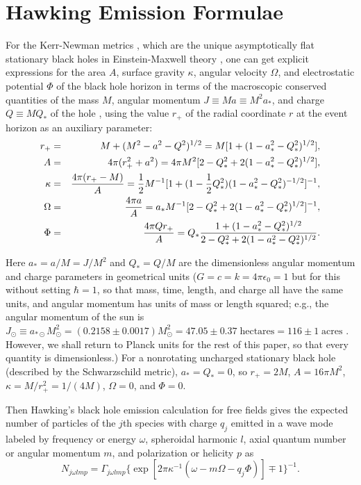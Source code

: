 \documentclass[12pt]{article} \usepackage{latexsym}
\begin{document}
\section{Hawking Emission Formulae}

For the Kerr-Newman metrics \cite{Kerr,Newman}, which are the unique
asymptotically flat stationary black holes in Einstein-Maxwell theory
\cite{Israeluniqueness,Carteruniqueness,HE,Robinson,Mazur}, one can
get explicit expressions for the area $A$, surface gravity $\kappa$,
angular velocity $\Omega$, and electrostatic potential $\Phi$ of the
black hole horizon in terms of the macroscopic conserved quantities of
the mass $M$, angular momentum $J \equiv Ma \equiv M^2 a_*$, and
charge $Q \equiv MQ_*$ of the hole \cite{Page76}, using the value
$r_+$ of the radial coordinate $r$ at the event horizon as an
auxiliary parameter:
\begin{eqnarray}
r_+ &=& M+(M^2-a^2-Q^2)^{1/2} = M[1+(1-a_*^2-Q_*^2)^{1/2}],
 \nonumber \\
A &=& 4\pi(r_+^2+a^2) = 4\pi M^2[2-Q_*^2+2(1-a_*^2-Q_*^2)^{1/2}],
 \nonumber \\
\kappa &=& {4\pi(r_+-M)\over A}
 = {1\over 2}M^{-1}[1+(1-{1\over 2}Q_*^2)(1-a_*^2-Q_*^2)^{-1/2}]^{-1},
 \nonumber \\
\Omega &=& {4\pi a\over A}
 = a_*M^{-1}[2-Q_*^2+2(1-a_*^2-Q_*^2)^{1/2}]^{-1},
 \nonumber \\
\Phi &=& {4\pi Q r_+ \over A}
 = Q_* {1+(1-a_*^2-Q_*^2)^{1/2} \over 2-Q_*^2+2(1-a_*^2-Q_*^2)^{1/2}}.
 \label{eq:3}
 \end{eqnarray}

Here $a_* = a/M = J/M^2$ and $Q_* = Q/M$ are the dimensionless angular
momentum and charge parameters in geometrical units
($G=c=k=4\pi\epsilon_0=1$ but for this without setting $\hbar=1$, so
that mass, time, length, and charge all have the same units, and
angular momentum has units of mass or length squared; e.g., the
angular momentum of the sun is $J_{\odot} \equiv a_{*\odot}M_{\odot}^2
= (0.2158 \pm 0.0017)M_{\odot}^2 = 47.05 \pm 0.37 \; \mathrm{hectares}
= 116 \pm 1 \; \mathrm{acres}$ \cite{Pij,MAIN}.  However, we shall
return to Planck units for the rest of this paper, so that every
quantity is dimensionless.)  For a nonrotating uncharged stationary
black hole (described by the Schwarzschild metric), $a_* = Q_* = 0$,
so $r_+ = 2M$, $A = 16\pi M^2$, $\kappa = M/r_+^2 = 1/(4M)$, $\Omega =
0$, and $\Phi = 0$.

Then Hawking's black hole emission calculation \cite{Haw1,Haw2} for
free fields gives the expected number of particles of the $j$th
species with charge $q_j$ emitted in a wave mode labeled by frequency or
energy $\omega$, spheroidal harmonic $l$, axial quantum number or
angular momentum $m$, and polarization or helicity $p$ as
 \begin{equation}
 N_{j\omega lmp} =
  \Gamma_{j\omega lmp}\{\exp[2\pi\kappa^{-1}(\omega-m\Omega-q_j\Phi)]
   \mp 1\}^{-1}.
 \label{eq:4}
 \end{equation}
\end{document}
